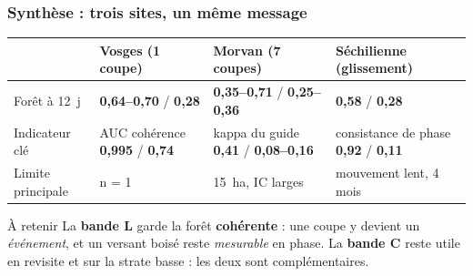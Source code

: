 \documentclass[aspectratio=169]{beamer}
\newcommand{\Lb}[1]{\textcolor{Lband}{\textbf{#1}}}
\newcommand{\Cb}[1]{\textcolor{Cband}{\textbf{#1}}}
\begin{document}
\begin{frame}{\phantom{x}}
	\frametitle{Synthèse : trois sites, un même message}
	\vspace{-4pt}\scriptsize
	\centering
	\begin{tabular}{p{2.3cm}p{3.6cm}p{3.4cm}p{3.6cm}}
		\toprule
		& \textbf{Vosges} (1 coupe) & \textbf{Morvan} (7 coupes) & \textbf{Séchilienne} (glissement)\\
		\midrule
		Forêt à 12~j & \Lb{0,64--0,70} / \Cb{0,28} & \Lb{0,35--0,71} / \Cb{0,25--0,36} & \Lb{0,58} / \Cb{0,28}\\
		Indicateur clé & AUC cohérence \Lb{0,995} / \Cb{0,74} & kappa du guide \Lb{0,41} / \Cb{0,08--0,16} &
		consistance de phase \Lb{0,92} / \Cb{0,11}\\
		Limite principale & n = 1 & 15~ha, IC larges & mouvement lent, 4 mois\\
		\bottomrule
	\end{tabular}

	\vspace{10pt}
	\begin{exampleblock}{À retenir}
		\scriptsize
		La \Lb{bande L} garde la forêt \textbf{cohérente} : une coupe y devient un \emph{événement}, et un versant
		boisé reste \emph{mesurable} en phase. La \Cb{bande C} reste utile en revisite et sur la strate basse :
		les deux sont complémentaires.
	\end{exampleblock}
\end{frame}
\end{document}
